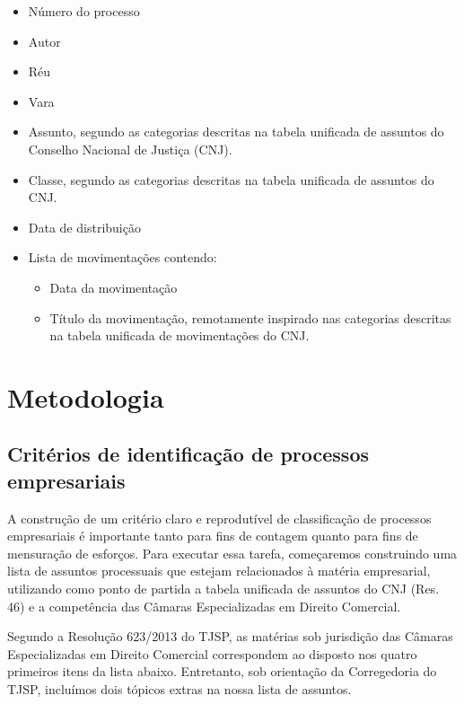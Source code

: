\documentclass[]{book}
\providecommand{\tightlist}{%
  \setlength{\itemsep}{0pt}\setlength{\parskip}{0pt}}
\begin{document}
\begin{itemize}
\tightlist
\item
  Número do processo
\item
  Autor
\item
  Réu
\item
  Vara
\item
  Assunto, segundo as categorias descritas na tabela unificada de
  assuntos do Conselho Nacional de Justiça (CNJ).
\item
  Classe, segundo as categorias descritas na tabela unificada de
  assuntos do CNJ.
\item
  Data de distribuição
\item
  Lista de movimentações contendo:

  \begin{itemize}
  \tightlist
  \item
    Data da movimentação
  \item
    Título da movimentação, remotamente inspirado nas categorias
    descritas na tabela unificada de movimentações do CNJ.
  \end{itemize}
\end{itemize}

\chapter{Metodologia}\label{metodologia}

\section{Critérios de identificação de processos
empresariais}\label{criterios-de-identificacao-de-processos-empresariais}

A construção de um critério claro e reprodutível de classificação de
processos empresariais é importante tanto para fins de contagem quanto
para fins de mensuração de esforços. Para executar essa tarefa,
começaremos construindo uma lista de assuntos processuais que estejam
relacionados à matéria empresarial, utilizando como ponto de partida a
tabela unificada de assuntos do CNJ (Res. 46) e a competência das
Câmaras Especializadas em Direito Comercial.

Segundo a Resolução 623/2013 do TJSP, as matérias sob jurisdição das
Câmaras Especializadas em Direito Comercial correspondem ao disposto nos
quatro primeiros itens da lista abaixo. Entretanto, sob orientação da
Corregedoria do TJSP, incluímos dois tópicos extras na nossa lista de
assuntos.
\end{document}
